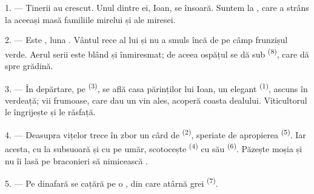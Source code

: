 %

\VUsaut{4.0mm}
\VUsaut{1.6mm}
\VUsaut{3.2mm}

\VUsaut{1.6mm}
\VUsaut{2.6mm}

\VUsaut{3.0mm}

1. --- Tinerii au crescut. Unul dintre ei, Ioan, se însoară. Suntem la
, care a strâns la aceeași masă familiile mirelui și ale
miresei.

2. --- Este , luna . Vântul rece al lui
 și  nu a smuls încă de pe câmp frunzișul
verde. Aerul serii este blând și înmiresmat; de aceea ospățul se dă sub
 \textsuperscript{(8)}, care dă spre grădină.

3. --- În depărtare, pe  \textsuperscript{(3)}, se află casa
părinților lui Ioan, un  elegant \textsuperscript{(1)}, ascuns în
verdeață; vii frumoase, care dau un vin ales, acoperă coasta dealului. Viticultorul
le îngrijește și le răsfață.

4. --- Deasupra vițelor trece în zbor un cârd de 
\textsuperscript{(2)}, speriate de apropierea 
\textsuperscript{(5)}. Iar acesta, cu  la subsuoară și cu
 pe umăr, scotocește  \textsuperscript{(4)} cu
 său \textsuperscript{(6)}. Păzește moșia și nu îi lasă pe
braconieri să nimicească .

5. --- Pe dinafară se cațără pe  o , din
care atârnă  grei \textsuperscript{(7)}.

